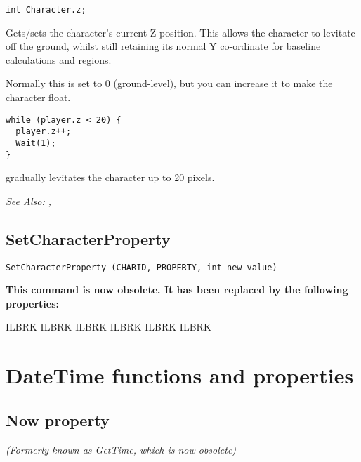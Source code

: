 \begin{verbatim}
int Character.z;
\end{verbatim}

Gets/sets the character's current Z position. This allows the character to levitate
off the ground, whilst still retaining its normal Y co-ordinate for baseline calculations
and regions.

Normally this is set to 0 (ground-level), but you can increase it to make the character float.

\begin{verbatim}
while (player.z < 20) {
  player.z++;
  Wait(1);
}
\end{verbatim}
gradually levitates the character up to 20 pixels.

\it{See Also:} ,


\subsection{SetCharacterProperty}\label{SetCharacterProperty}%

\begin{verbatim}
SetCharacterProperty (CHARID, PROPERTY, int new_value)
\end{verbatim}

\bf{This command is now obsolete. It has been replaced by the following properties:}

 ILBRK
 ILBRK
 ILBRK
 ILBRK
 ILBRK
 ILBRK



\section{DateTime functions and properties}%


\subsection{Now property}\label{DateTime.Now}%

\it{(Formerly known as GetTime, which is now obsolete)}

